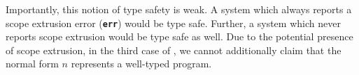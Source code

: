 Importantly, this notion of type safety is weak. A system which always reports a scope extrusion error (\textbf{\texttt{err}}) would be type safe. Further, a system which never reports scope extrusion would be type safe as well. Due to the potential presence of scope extrusion, in the third case of , we cannot additionally claim that the normal form $n$ represents a well-typed \efflang{} program. 






    



